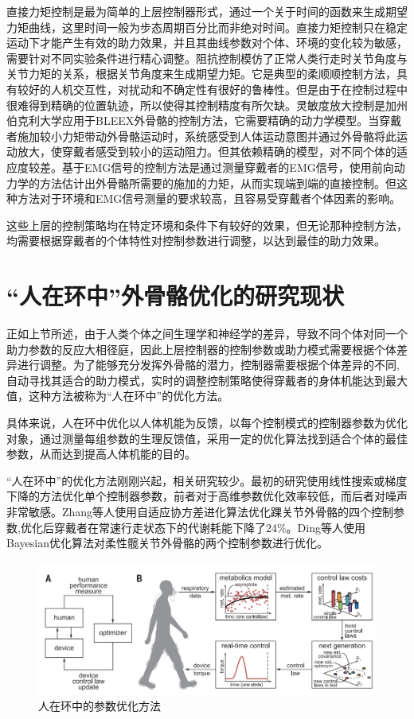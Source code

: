 直接力矩控制是最为简单的上层控制器形式，通过一个关于时间的函数来生成期望力矩曲线\cite{p32,p33}，这里时间一般为步态周期百分比而非绝对时间。直接力矩控制只在稳定运动下才能产生有效的助力效果，并且其曲线参数对个体、环境的变化较为敏感，需要针对不同实验条件进行精心调整。阻抗控制模仿了正常人类行走时关节角度与关节力矩的关系，根据关节角度来生成期望力矩\cite{p34}。它是典型的柔顺顺控制方法，具有较好的人机交互性，对扰动和不确定性有很好的鲁棒性。但是由于在控制过程中很难得到精确的位置轨迹，所以使得其控制精度有所欠缺。灵敏度放大控制是加州伯克利大学应用于BLEEX外骨骼的控制方法\cite{p35}，它需要精确的动力学模型。当穿戴者施加较小力矩带动外骨骼运动时，系统感受到人体运动意图并通过外骨骼将此运动放大，使穿戴者感受到较小的运动阻力。但其依赖精确的模型，对不同个体的适应度较差。基于EMG信号的控制方法是通过测量穿戴者的EMG信号，使用前向动力学的方法估计出外骨骼所需要的施加的力矩，从而实现端到端的直接控制\cite{p36}。但这种方法对于环境和EMG信号测量的要求较高，且容易受穿戴者个体因素的影响。

这些上层的控制策略均在特定环境和条件下有较好的效果，但无论那种控制方法，均需要根据穿戴者的个体特性对控制参数进行调整，以达到最佳的助力效果。

\section{“人在环中”外骨骼优化的研究现状}

正如上节所述，由于人类个体之间生理学和神经学的差异，导致不同个体对同一个助力参数的反应大相径庭\cite{p37}，因此上层控制器的控制参数或助力模式需要根据个体差异进行调整。为了能够充分发挥外骨骼的潜力，控制器需要根据个体差异的不同,自动寻找其适合的助力模式，实时的调整控制策略使得穿戴者的身体机能达到最大值，这种方法被称为“人在环中”的优化方法\cite{p38}。

具体来说，人在环中优化以人体机能为反馈，以每个控制模式的控制器参数为优化对象，通过测量每组参数的生理反馈值，采用一定的优化算法找到适合个体的最佳参数，从而达到提高人体机能的目的。

“人在环中”的优化方法刚刚兴起，相关研究较少。最初的研究使用线性搜索\cite{p38}或梯度下降\cite{p39}的方法优化单个控制器参数，前者对于高维参数优化效率较低，而后者对噪声非常敏感。Zhang等人\cite{p40}使用自适应协方差进化算法优化踝关节外骨骼的四个控制参数,优化后穿戴者在常速行走状态下的代谢耗能下降了24\%。Ding等人\cite{p41}使用Bayesian优化算法对柔性髋关节外骨骼的两个控制参数进行优化。

\begin{figure}[htb]
    \includegraphics[width=15cm]{fig/f18.jpg}
    \caption{人在环中的参数优化方法\cite{p40}}
    \label{fig:mark}
\end{figure}

